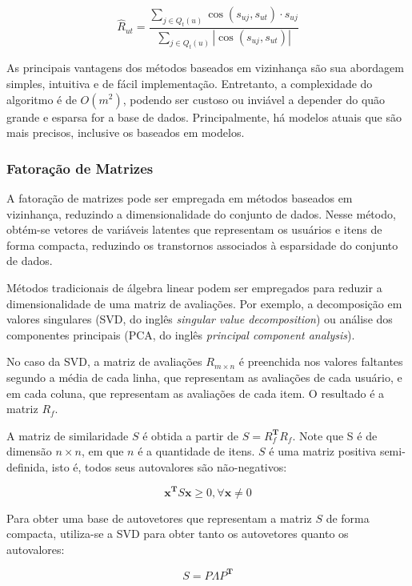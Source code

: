\begin{equation}
    \hat{R}_{ut} = \frac{\sum_{j \in Q_t(u)} \cos(s_{uj},s_{ut}) \cdot s_{uj}}{\sum_{j \in Q_t(u)} |\cos(s_{uj},s_{ut})|}
\end{equation}

As principais vantagens dos métodos baseados em vizinhança são sua abordagem
simples, intuitiva e de fácil implementação. Entretanto, a complexidade do
algoritmo é de $O(m^2)$, podendo ser custoso ou inviável a depender do quão
grande e esparsa for a base de dados. Principalmente, há modelos atuais que são
mais precisos, inclusive os baseados em modelos.

\subsubsection{Fatoração de Matrizes}
A fatoração de matrizes pode ser empregada em métodos baseados em vizinhança,
reduzindo a dimensionalidade do conjunto de dados. Nesse método, obtém-se
vetores de variáveis latentes que representam os usuários e itens de forma
compacta, reduzindo os transtornos associados à esparsidade do conjunto de
dados.

Métodos tradicionais de álgebra linear podem ser empregados para reduzir a
dimensionalidade de uma matriz de avaliações. Por exemplo, a decomposição em
valores singulares (SVD, do inglês \textit{singular value decomposition}) ou
análise dos componentes principais (PCA, do inglês \textit{principal component
analysis}).

No caso da SVD, a matriz de avaliações $R_{m \times n}$ é preenchida nos valores faltantes
segundo a média de cada linha, que representam as avaliações de cada usuário, e
em cada coluna, que representam as avaliações de cada item. O resultado é a
matriz $R_f$.

A matriz de similaridade $S$ é obtida a partir de $S = R_f^{\mathbf{T} }R_f$.
Note que S é de dimensão $n \times n$, em que $n$ é a quantidade de itens. $S$ é
uma matriz positiva semi-definida, isto é, todos seus autovalores são
não-negativos:

\begin{equation}
    \mathbf{x}^{\mathbf{T}} S \mathbf{x} \geq 0, \forall \mathbf{x} \neq 0
\end{equation}

 Para obter uma base de autovetores que representam a matriz $S$ de forma
 compacta, utiliza-se a SVD para obter tanto os autovetores quanto os autovalores:

\begin{equation}
    S = P \Lambda P^{\mathbf{T}}
\end{equation}

